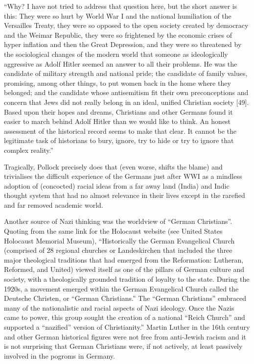 \begin{myquote}
“Why? I have not tried to address that question here, but the short answer is this: They were so hurt by World War I and the national humiliation of the Versailles Treaty, they were so opposed to the open society created by democracy and the Weimar Republic, they were so frightened by the economic crises of hyper inflation and then the Great Depression, and they were so threatened by the sociological changes of the modern world that someone as ideologically aggressive as Adolf Hitler seemed an answer to all their problems. He was the candidate of military strength and national pride; the candidate of family values, promising, among other things, to put women back in the home where they belonged; and the candidate whose antisemitism fit their own preconceptions and concern that Jews did not really belong in an ideal, unified Christian society [49]. Based upon their hopes and dreams, Christians and other Germans found it easier to march behind Adolf Hitler than we would like to think. An honest assessment of the historical record seems to make that clear. It cannot be the legitimate task of historians to bury, ignore, try to hide or try to ignore that complex reality.”
\end{myquote}
\newpage

Tragically, Pollock precisely does that (even worse, shifts the blame) and trivialises the difficult experience of the Germans just after WWI as a mindless adoption of (concocted) racial ideas from a far away land (India) and Indic thought system that had no almost relevance in their lives except in the rarefied and far removed academic world.

Another source of Nazi thinking was the worldview of “German Christians”. Quoting from the same link for the Holocaust website (see United States Holocaust Memorial Museum), “Historically the German Evangelical Church (comprised of 28 regional churches or Landeskirchen that included the three major theological traditions that had emerged from the Reformation: Lutheran, Reformed, and United) viewed itself as one of the pillars of German culture and society, with a theologically grounded tradition of loyalty to the state. During the 1920s, a movement emerged within the German Evangelical Church called the Deutsche Christen, or “German Christians.” The “German Christians” embraced many of the nationalistic and racial aspects of Nazi ideology. Once the Nazis came to power, this group sought the creation of a national “Reich Church” and supported a “nazified” version of Christianity.” Martin Luther in the 16th century and other German historical figures were not free from anti-Jewish racism and it is not surprising that German Christians were, if not actively, at least passively involved in the pogroms in Germany.

